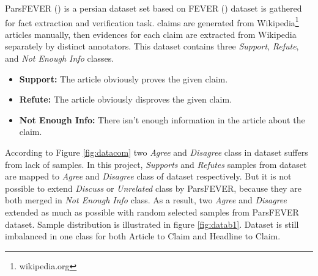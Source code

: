 ParsFEVER (\cite{parsfever}) is a persian dataset set based on FEVER (\cite{fever}) dataset is gathered for fact extraction and verification task. \cite{parsfever} claims are generated from Wikipedia\footnote{wikipedia.org} articles manually, then evidences for each claim are extracted from Wikipedia separately by distinct annotators. This dataset contains three \textit{Support}, \textit{Refute}, and \textit{Not Enough Info} classes. 
\begin{itemize}
	\item {\color{green!70!black}\textbf{Support:}} The article obviously proves the given claim. 
	\item {\color{red!60!black}\textbf{Refute:}} The article obviously disproves the given claim.
	\item {\color{gray}\textbf{Not Enough Info:}} There isn't enough information in the article about the claim. 
\end{itemize}                

According to Figure \ref{fig:datacom} two \textit{Agree} and \textit{Disagree} class in \cite{stance_persian} dataset suffers from lack of samples. In this project, \textit{Supports} and \textit{Refutes} samples from \cite{parsfever} dataset are mapped to \textit{Agree} and \textit{Disagree} class of \cite{stance_persian} dataset respectively. 
But it is not possible to extend \textit{Discuss} or \textit{Unrelated} class by ParsFEVER, because they are both merged in \textit{Not Enough Info} class. As a result, two \textit{Agree} and \textit{Disagree} extended as much as possible with random selected samples from ParsFEVER dataset. Sample distribution is illustrated in figure \ref{fig:datab1}. Dataset is still imbalanced in one class for both Article to Claim and Headline to Claim.


